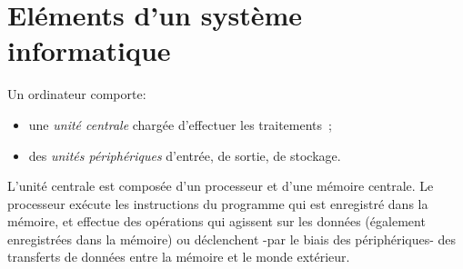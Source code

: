 
\chapter{El\'ements d'un syst\`eme informatique}

Un ordinateur comporte:
\begin{itemize}
\item une {\em unit\'e centrale}  charg\'ee d'effectuer les traitements~; 
\item des {\em unit\'es p\'eriph\'eriques} d'entr\'ee, de sortie, de stockage.
\end{itemize}

L'unit\'e centrale est compos\'ee
d'un processeur et d'une m\'emoire centrale.
Le processeur ex\'ecute les instructions du programme qui est enregistr\'e 
dans la m\'emoire, et effectue des op\'erations
qui agissent sur les donn\'ees (\'egalement
enregistr\'ees dans la m\'emoire) ou d\'eclenchent -par le biais des
p\'eriph\'eriques- des transferts de donn\'ees entre la m\'emoire et le monde
ext\'erieur.


